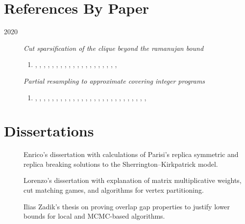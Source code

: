 \documentclass{article}
\theoremstyle{definition}
\begin{document}

\section{References By Paper}

\begin{description}
\item[2020] \emph{Cut sparsification of the clique beyond the ramanujan bound}
\begin{enumerate}[--]
\item \cite{CR02}, \cite{DMS17}, \cite{FGL12}, \cite{Gue03}, \cite{JS17}, \cite{Neu13}, \cite{Pan14}, \cite{Par80}, \cite{Tal06}, \cite{Sen18}, \cite{SS11}, \cite{ST11}, \cite{ACK+16}, \cite{AZLO15}, \cite{BK96}, \cite{Bor19}, \cite{BSS09}, \cite{LS17}, \cite{Pol45}, \cite{ST18}, \cite{Eva10}
\end{enumerate}

\item[\cite{CHS16}] \emph{Partial resampling to approximate covering integer programs}
\begin{enumerate}[--]
\item \cite{BKNS12}, \cite{CT91}, \cite{CFLP99}, \cite{CQ18}, \cite{CQ19}, \cite{CC08}, \cite{Chv97}, \cite{Dob82}, \cite{EL73}, \cite{Fei98}, \cite{FW82}, \cite{Har16}, \cite{HS19}, \cite{Har15}, \cite{Joh73}, \cite{Kar72}, \cite{KY05}, \cite{LLRS01}, \cite{Lov75}, \cite{MT10}, \cite{PS97}, \cite{RT87}, \cite{Sla97}, \cite{Sri06}, \cite{Tre01}, \cite{Vaz13}, \cite{WRM15}, \cite{You14}
\end{enumerate}
\end{description}



\section{Dissertations}

\begin{description}
\item[\cite{Mal19}] Enrico's dissertation with calculations of Parisi's replica symmetric and replica breaking solutions to the Sherrington--Kirkpatrick model.

\item[\cite{Ore11}] Lorenzo's dissertation with explanation of matrix multiplicative weights, cut matching games, and algorithms for vertex partitioning.

\item[\cite{Zad19}] Ilias Zadik's thesis on proving overlap gap properties to justify lower bounds for local and MCMC-based algorithms.
\end{description}
\end{document}
